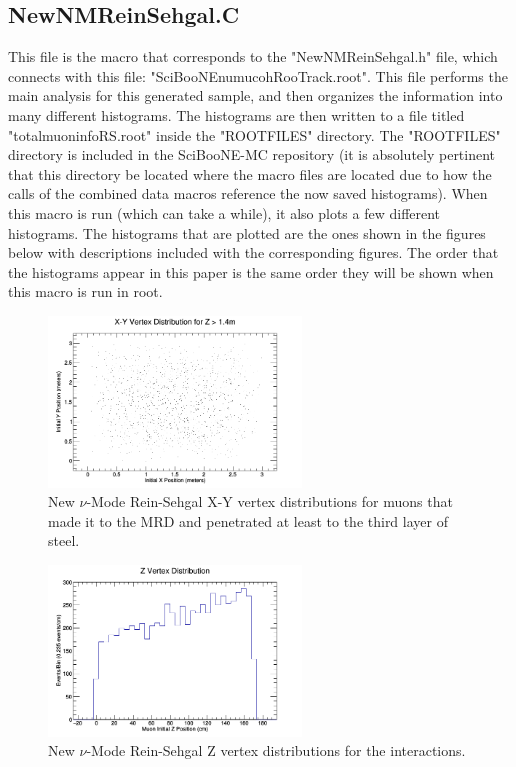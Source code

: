 \documentclass[11pt]{article}
\begin{document}
\subsection{NewNMReinSehgal.C}
This file is the macro that corresponds to the "NewNMReinSehgal.h" file, which connects with this file: "SciBooNE\textunderscore numu\textunderscore coh\textunderscore RooTrack.root". This file performs the main analysis for this generated sample, and then organizes the information into many different histograms. The histograms are then written to a file titled "totalmuoninfoRS.root" inside the "ROOTFILES" directory. The "ROOTFILES" directory is included in the SciBooNE-MC repository (it is absolutely pertinent that this directory be located where the macro files are located due to how the calls of the combined data macros reference the now saved histograms). When this macro is run (which can take a while), it also plots a few different histograms. The histograms that are plotted are the ones shown in the figures below with descriptions included with the corresponding figures. The order that the histograms appear in this paper is the same order they will be shown when this macro is run in root.

\begin{figure}[H]
\centering
\includegraphics[width=0.6\textwidth]{NewNMReinSehgalImages/1-X-YVertexDistributionNMRS.png}
\caption{New $\nu$-Mode Rein-Sehgal X-Y vertex distributions for muons that made it to the MRD and penetrated at least to the third layer of steel.}
\end{figure}

\begin{figure}[H]
\centering
\includegraphics[width=0.6\textwidth]{NewNMReinSehgalImages/2-ZVertexDistributionNMRS.png}
\caption{New $\nu$-Mode Rein-Sehgal Z vertex distributions for the interactions.}
\end{figure}
\end{document}
